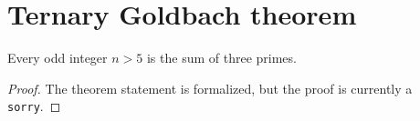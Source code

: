 \section{Ternary Goldbach theorem}

\begin{theorem}
\label{thm:ternary-goldbach}
\notready
Every odd integer $n>5$ is the sum of three primes.
\end{theorem}

\begin{proof}
The theorem statement is formalized, but the proof is currently a \texttt{sorry}.
\end{proof}

